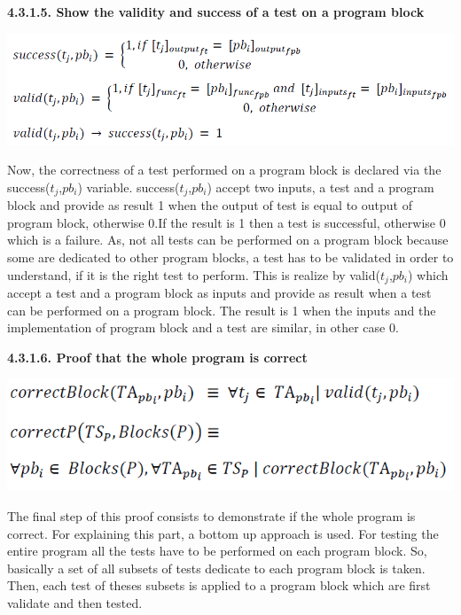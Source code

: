 \documentclass[conference,compsoc]{IEEEtran}
\begin{document}
\noindent
\newline
\textbf{4.3.1.5. Show the validity and success of a test on a program block}
\begin{center}
\includegraphics[scale=0.5]{Proof1-Part5.png} 
\end{center}

Now, the correctness of a test performed on a program block is declared via the success($t_j$,$pb_i$) variable. success($t_j$,$pb_i$) accept two inputs, a test and a program block and provide as result 1 when the output of test is equal to output of program block, otherwise 0.If the result is 1 then a test is successful, otherwise 0 which is a failure. 
                                                                                                                                                          As, not all tests can be performed on a program block because some are dedicated to other program blocks, a test has to be validated in order to understand, if it is the right test to perform. This is realize by valid($t_j$,$pb_i$) which accept a test and a program block as inputs and provide as result when a test can be performed on a program block. The result is 1 when the inputs and the implementation of program block and a test are similar, in other case 0. %

\noindent
\newline
\textbf{4.3.1.6. Proof that the whole program is correct}
\begin{center}
\includegraphics[scale=0.5]{Proof1-Part6.png} 
\end{center}

The final step of this proof consists to demonstrate if the whole program is correct. For explaining this part, a bottom up approach is used. For testing the entire program all the tests have to be performed on each program block. So, basically a set of all subsets of tests dedicate to each program block is taken. Then, each test of theses subsets is applied to a program block which are first validate and then tested. 
\end{document}
